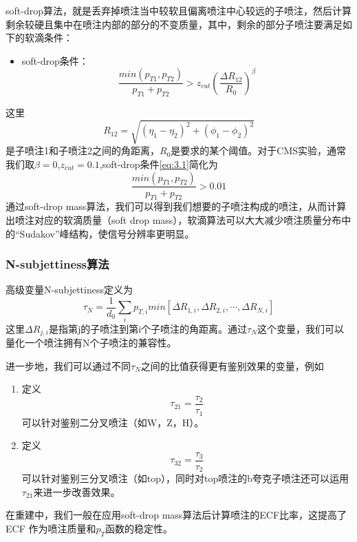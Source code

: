 soft-drop算法，就是丢弃掉喷注当中较软且偏离喷注中心较远的子喷注，然后计算剩余较硬且集中在喷注内部的部分的不变质量，其中，剩余的部分子喷注要满足如下的软滴条件：
\begin{itemize}
    \item soft-drop条件：
    \begin{equation}\label{eq:3.1}
        \frac{min(p_{T1}, p_{T2})}{p_{T1}+p_{T2}}>z_{cut} \left(\frac{\Delta R_{12}}{R_0}\right)^\beta
    \end{equation}
\end{itemize}
这里
\begin{equation}\label{eq:3.2}
    R_{12}=\sqrt{(\eta_1-\eta_2)^2+(\phi_1-\phi_2)^2}
\end{equation}
是子喷注1和子喷注2之间的角距离，$R_0$是要求的某个阈值。对于CMS实验，通常我们取$\beta=0$,$z_{cut}=0.1$,soft-drop条件\eqref{eq:3.1}简化为
\begin{equation}
    \frac{min(p_{T1}, p_{T2})}{p_{T1}+p_{T2}}>0.01
\end{equation}
通过soft-drop mass算法，我们可以得到我们想要的子喷注构成的喷注，从而计算出喷注对应的软滴质量（soft drop mass），软滴算法可以大大减少喷注质量分布中的“Sudakov”峰结构，使信号分辨率更明显。
\subsubsection{N-subjettiness算法}
高级变量N-subjettiness定义为
\begin{equation}
    \tau_N=\frac{1}{d_0}\sum_i p_{T,i}min\left[\Delta R_{1,i},\Delta R_{2,i},\cdots,\Delta R_{N,i}\right]
\end{equation}
这里$\Delta R_{j,i}$是指第j的子喷注到第i个子喷注的角距离。通过$\tau_N$这个变量，我们可以量化一个喷注拥有N个子喷注的兼容性。

进一步地，我们可以通过不同$\tau_N$之间的比值获得更有鉴别效果的变量，例如
\begin{enumerate}[(1)]
    \item 定义
    \begin{equation}
        \tau_{21}=\frac{\tau_2}{\tau_1}
    \end{equation}
    可以针对鉴别二分叉喷注（如W，Z，H）。
    \item 定义
    \begin{equation}
        \tau_{32}=\frac{\tau_3}{\tau_2}
    \end{equation}
    可以针对鉴别三分叉喷注（如top），同时对top喷注的b夸克子喷注还可以运用$\tau_{21}$来进一步改善效果。
\end{enumerate}
在重建中，我们一般在应用soft-drop mass算法后计算喷注的ECF比率，这提高了 ECF 作为喷注质量和$p_T$函数的稳定性。

